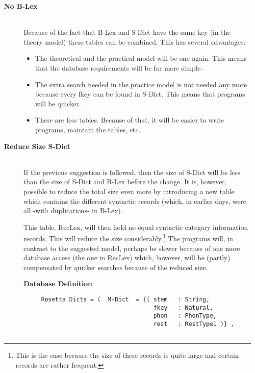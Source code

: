\begin{description}
  \item [{\bf No B-Lex}]\hspace{1cm}\\
        Because of the fact that B-Lex and S-Dict have the same key (in the
        theory model) these tables can be combined. This has several advantages:
 
        \begin{itemize}
            \item The theoretical and the practical model will be one again.
                  This means that the database requirements will be far more 
                  simple.
            \item The extra search needed in the practice model is not needed 
                  any more because every fkey can be found in S-Dict. This
                  means that programs will be quicker.
            \item There are less tables. Because of that, it will be easier to
                  write programs, maintain the tables, etc.
        \end{itemize}
 
  \item [{\bf Reduce Size S-Dict}]\hspace{1cm}\\
        If the previous suggestion is followed, then the size of S-Dict will
        be less than the size of S-Dict and B-Lex before the change. It is,
        however, possible to reduce the total size even more by introducing
        a new table which contains the different syntactic records (which, in
        earlier days, were all -with duplications- in B-Lex). 
 
        This table, RecLex, will then hold no
        equal syntactic category information records. This will reduce the 
        size considerably.\footnote{This is the case because the size of 
        these records is  
        quite large and certain records are rather frequent.} The programs 
        will, in contrast to the suggested model, perhaps be slower because 
        of one more database access (the one in RecLex) which, however, will be 
        (partly) compensated by quicker searches because of the reduced size.
 
\newpage
{\bf Database Definition}
\begin{verbatim}
     Rosetta Dicts = (  M-Dict  = {( stem   : String,
                                     fkey   : Natural,
                                     phon   : PhonType,
                                     rest   : RestType1 )} ,
           

\end{verbatim}
\end{description}
